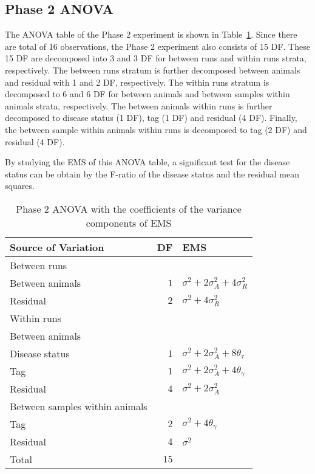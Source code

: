 \documentclass[article]{jss}
\begin{document}
\subsection{Phase 2 ANOVA}
The ANOVA table of the Phase 2 experiment is shown in Table~\ref{tab:Phase2ANOVA}. Since there are total of 16 observations, the Phase 2 experiment also consists of 15 DF. These 15 DF are decomposed into 3 and 3 DF for between runs and within runs strata, respectively. The between runs stratum is further decomposed between animals and residual with 1 and 2 DF, respectively. The within runs stratum is decomposed to 6 and 6 DF for between animals and between samples within animals strata, respectively. The between animals within runs is further decomposed to disease status (1 DF), tag (1 DF) and residual (4 DF). Finally, the between sample within animals within runs is decomposed to tag (2 DF) and residual (4 DF). 

By studying the EMS of this ANOVA table, a significant test for the disease status can be obtain by the F-ratio of the disease status and the residual mean squares.

\begin{table}[ht]
\centering
\caption{Phase 2 ANOVA with the coefficients of the variance components of EMS}
\begin{tabular}[t]{lrl}
\hline
\multicolumn{1}{l}{Source of Variation} & \multicolumn{1}{l}{DF} & \multicolumn{1}{l}{EMS}\\
\hline
Between runs 		\\
\hspace{3mm}Between animals & $1$ 	& $\sigma^2 + 2\sigma_{A}^2 + 4\sigma_{R}^2$\\
\hspace{3mm}Residual		& $2$ 	& $\sigma^2 + 4\sigma_{R}^2$\\
\hline
Within runs 				\\
\hspace{3mm}Between animals \\
\hspace{6mm}Disease status  & $1$ 	& $\sigma^2 + 2\sigma_{A}^2 + 8\theta_{\tau}$\\
\hspace{6mm}Tag				& $1$ 	& $\sigma^2 + 2\sigma_{A}^2 + 4\theta_{\gamma}$\\
\hspace{6mm}Residual		& $4$ 	& $\sigma^2 + 2\sigma_{A}^2$\\
\hspace{3mm}Between samples within animals		&\\
\hspace{6mm}Tag				& $2$ 	& $\sigma^2 + 4\theta_{\gamma}$\\
\hspace{6mm}Residual		& $4$ 	& $\sigma^2$\\
\hline
Total 						& $15$      & \\
\hline
\end{tabular}
\label{tab:Phase2ANOVA}
\end{table}
\end{document}
